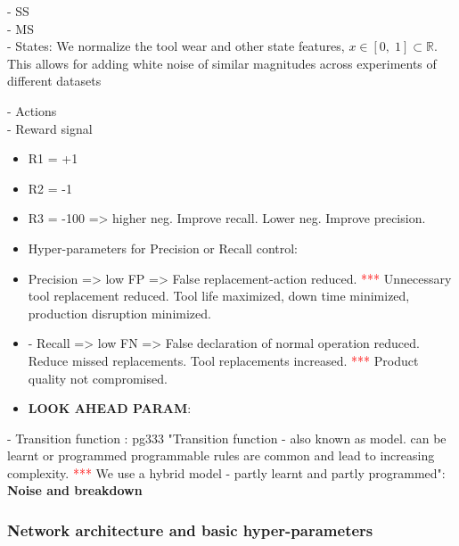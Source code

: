 \documentclass[a4paper, 12pt]{article}
\begin{document}
- SS\\
- MS\\
- States: We normalize the tool wear and other state features, $x \in [0,\;1] \subset \mathbb{R} $. This allows for adding white noise of similar magnitudes across experiments of different datasets

- Actions\\
- Reward signal\\
\begin{itemize}
	\item R1 = +1 
	\item R2 = -1
	\item R3 = -100 => higher neg. Improve recall. Lower neg. Improve precision. 
	\item Hyper-parameters for Precision or Recall control: 
	\item Precision => low FP => False replacement-action reduced. \textcolor{red}{***} Unnecessary tool replacement reduced. Tool life maximized, down time minimized, production disruption minimized. 
	\item - Recall => low FN => False declaration of normal operation reduced. Reduce missed replacements. Tool replacements increased. \textcolor{red}{***} Product quality not compromised. 
	\item \textbf{LOOK AHEAD PARAM}: 
\end{itemize}

- Transition function \citep{graesser2019}: pg333 "Transition function  - also known as model. can be learnt or programmed programmable rules are common and lead to increasing complexity. \textcolor{red}{***} We use a hybrid model - partly learnt and partly programmed": \textbf{Noise and breakdown}\\

\subsubsection{Network architecture and basic hyper-parameters}
\end{document}
